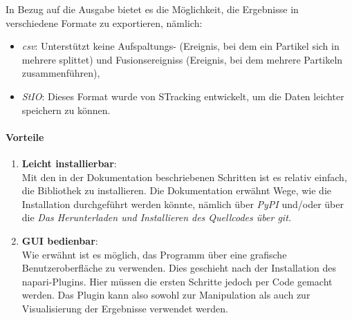 In Bezug auf die Ausgabe bietet es die Möglichkeit, die Ergebnisse in verschiedene Formate zu exportieren, nämlich:
\begin{itemize}
\item \textit{csv}: Unterstützt keine Aufspaltungs- (Ereignis, bei dem ein Partikel sich in mehrere splittet) und Fusionsereigniss (Ereignis, bei dem mehrere Partikeln zusammenführen),
\item \textit{StIO}: Dieses Format wurde von STracking entwickelt, um die Daten leichter speichern zu können.
\end{itemize}

	\paragraph{Vorteile}
		\begin{enumerate}
    			\item \textbf{Leicht installierbar}:\\
				Mit den in der Dokumentation beschriebenen Schritten ist es relativ einfach, die Bibliothek zu installieren. Die Dokumentation erwähnt Wege, wie die Installation durchgeführt werden könnte, nämlich über \textit{PyPI} und/oder über die \textit{Das Herunterladen und Installieren des Quellcodes über git.}

    			\item \textbf{GUI bedienbar}:\\
				Wie erwähnt ist es möglich, das Programm über eine grafische Benutzeroberfläche zu verwenden. Dies geschieht nach der Installation des napari-Plugins.
Hier müssen die ersten Schritte jedoch per Code gemacht werden. 
Das Plugin kann also sowohl zur Manipulation als auch zur Visualisierung der Ergebnisse verwendet werden. 
		\end{enumerate}
		

